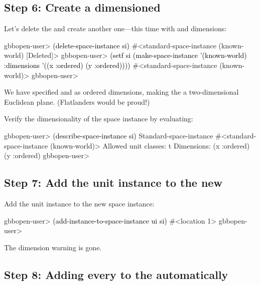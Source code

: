 \documentclass[10pt,twoside,english,pdftex]{article}
\begin{document}
\subsection*{Step 6: Create a dimensioned }

%
%
%
Let's delete the  and create another one---this time with
 and  dimensions:
%
\W\supp
\begin{example}
\textcolor{darkergray}{%
  gbbopen-user> \textcolor{black}{(delete-space-instance si)}
  #<standard-space-instance (known-world) [Deleted]>
  gbbopen-user> \textcolor{black}{(setf si (make-space-instance '(known-world)
              :dimensions '((x :ordered) (y :ordered))))}
  #<standard-space-instance (known-world)>
  gbbopen-user>}
\end{example}
%
We have specified  and  as ordered dimensions, making the
 a two-dimensional Euclidean plane.  (Flatlanders would be
proud!)

%
%
Verify the dimensionality of the  space instance by
evaluating:
%
\W\supp
\begin{example}
\textcolor{darkergray}{%
  gbbopen-user> \textcolor{black}{(describe-space-instance si)}
  Standard-space-instance #<standard-space-instance (known-world)>
    Allowed unit classes: t
    Dimensions:
      (x :ordered)
      (y :ordered)
  gbbopen-user>}
\end{example}

\subsection*{Step 7: Add the  unit instance to the new
  }

%
%
Add the  unit instance to the new  space
instance:
%
\W\supp
\begin{example}
\textcolor{darkergray}{%
  gbbopen-user> \textcolor{black}{(add-instance-to-space-instance ui si)}
  #<location 1>
  gbbopen-user>}
\end{example}
%
The dimension warning is gone.

\subsection*{Step 8: Adding every  to the 
  automatically}
\end{document}

